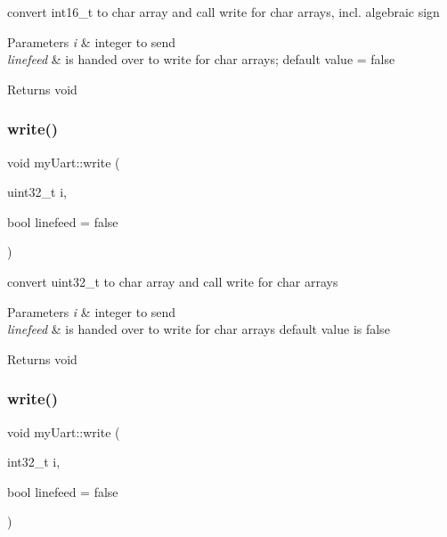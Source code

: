 convert int16\+\_\+t to char array and call write for char arrays, incl. algebraic sign 


\begin{DoxyParams}{Parameters}
{\em i} & integer to send \\
\hline
{\em linefeed} & is handed over to write for char arrays; default value = false \\
\hline
\end{DoxyParams}
\begin{DoxyReturn}{Returns}
void 
\end{DoxyReturn}
\mbox{\label{classmy_uart_a5acb02c4fd6606432a35afd9c94e0d7e}} 
\subsubsection{\texorpdfstring{write()}{write()}\hspace{0.1cm}{\footnotesize\ttfamily [5/8]}}
{\footnotesize\ttfamily void my\+Uart\+::write (\begin{DoxyParamCaption}\item[{uint32\+\_\+t}]{i,  }\item[{bool}]{linefeed = {\ttfamily false} }\end{DoxyParamCaption})}



convert uint32\+\_\+t to char array and call write for char arrays 


\begin{DoxyParams}{Parameters}
{\em i} & integer to send \\
\hline
{\em linefeed} & is handed over to write for char arrays default value is false \\
\hline
\end{DoxyParams}
\begin{DoxyReturn}{Returns}
void 
\end{DoxyReturn}
\mbox{\label{classmy_uart_a9d3c87876b26d17b23b1fc5aac850991}} 
\subsubsection{\texorpdfstring{write()}{write()}\hspace{0.1cm}{\footnotesize\ttfamily [6/8]}}
{\footnotesize\ttfamily void my\+Uart\+::write (\begin{DoxyParamCaption}\item[{int32\+\_\+t}]{i,  }\item[{bool}]{linefeed = {\ttfamily false} }\end{DoxyParamCaption})}



